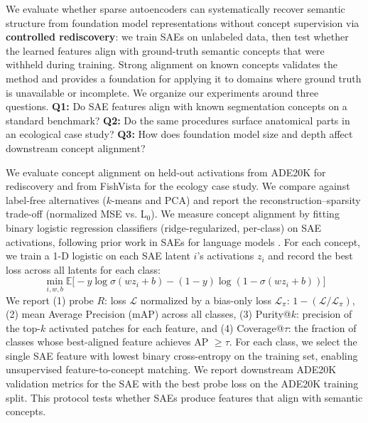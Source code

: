 \documentclass{article}
\theoremstyle{plain}
\theoremstyle{definition}
\theoremstyle{remark}
\begin{document}
We evaluate whether sparse autoencoders can systematically recover semantic structure from foundation model representations without concept supervision via \textbf{controlled rediscovery}: we train SAEs on unlabeled data, then test whether the learned features align with ground-truth semantic concepts that were withheld during training.
Strong alignment on known concepts validates the method and provides a foundation for applying it to domains where ground truth is unavailable or incomplete.
We organize our experiments around three questions.
\textbf{Q1:} Do SAE features align with known segmentation concepts on a standard benchmark?  
\textbf{Q2:} Do the same procedures surface anatomical parts in an ecological case study?
\textbf{Q3:} How does foundation model size and depth affect downstream concept alignment?

We evaluate concept alignment on held-out activations from ADE20K for rediscovery and from FishVista for the ecology case study.
We compare against label-free alternatives ($k$-means and PCA) and report the reconstruction–sparsity trade-off (normalized MSE vs. L$_0$).
We measure concept alignment by fitting binary logistic regression classifiers (ridge-regularized, per-class) on SAE activations, following prior work in SAEs for language models \citep{gao2025scaling}.
For each concept, we train a 1-D logistic on each SAE latent $i$'s activations $z_i$ and record the best loss across all latents for each class:
\begin{equation}\label{eq:probe-loss}
    \min_{i,w,b} \mathbb{E} \big[-y \log \sigma (wz_i + b) - (1-y) \log (1 - \sigma (wz_i+b)) \big]
\end{equation}
We report (1) probe $R$: loss $\mathcal{L}$ normalized by a bias-only loss $\mathcal{L}_\pi$: $1 - (\mathcal{L}/\mathcal{L}_\pi)$, (2) mean Average Precision (mAP) across all classes, (3) Purity@$k$: precision of the top-$k$ activated patches for each feature, and (4) Coverage@$\tau$: the fraction of classes whose best-aligned feature achieves AP $\geq \tau$. 
For each class, we select the single SAE feature with lowest binary cross-entropy on the training set, enabling unsupervised feature-to-concept matching.
We report downstream ADE20K validation metrics for the SAE with the best probe loss on the ADE20K training split.
This protocol tests whether SAEs produce features that align with semantic concepts.
\end{document}
